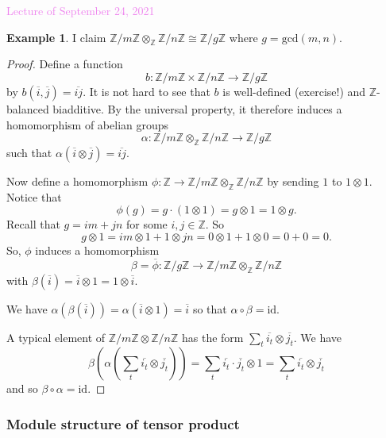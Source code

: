 \documentclass{amsart}[12pt]
\def\a{\alpha}
\newcommand{\id}{\mathrm{id}}
\newcommand{\Sept}[1]{\textcolor{violet}{Lecture of September #1, 2021}}
\newcommand{\Z}{\mathbb{Z}}
\numberwithin{equation}{section}
\theoremstyle{plain} %
\theoremstyle{definition}
\newtheorem{ex}[equation]{Example}
\theoremstyle{remark}
\newcommand{\sssec}[1]{\subsubsection{#1}}
\begin{document}
\Sept{24}

\begin{ex} I claim $\Z/m\Z \otimes_\Z \Z/n\Z \cong \Z/g\Z$ where $g = \mathrm{gcd}(m,n)$.
\end{ex}


\begin{proof}
Define a function
$$
b: \Z/m\Z \times \Z/n\Z \to \Z/g\Z
$$ 
by $b(\overline{i}, \overline{j}) = \overline{ij}$. It is not hard to see that $b$ is well-defined (exercise!) 
and $\Z$-balanced biadditive.
By the universal property, it therefore induces a homomorphism of abelian groups
$$
\a: \Z/m\Z \otimes_\Z \Z/n\Z \to \Z/g\Z
$$ 
such that $\a(\overline{i} \otimes \overline{j}) = \overline{ij}$. 

Now define a homomorphism $\phi: \Z \to \Z/m\Z \otimes_\Z \Z/n\Z$ by sending $1$ to $1 \otimes 1$. Notice that 
$$
\phi(g) = g \cdot (1 \otimes 1) = g \otimes 1 = 1 \otimes g.
$$
Recall that $g = i m + j n$ for some $i,j \in \Z$. So
$$
g \otimes 1 = i m \otimes 1 + 1 \otimes j n = 0 \otimes 1 + 1 \otimes 0 = 0 + 0 = 0.
$$
So, $\phi$ induces a homomorphism
$$
\beta = \overline{\phi}: \Z/g\Z \to \Z/m\Z \otimes_\Z \Z/n\Z
$$
with $\beta(\overline{i}) = \overline{i} \otimes 1 = 1 \otimes \overline{i}$.

We have $\a(\beta(\overline{i})) = \a(\overline{i} \otimes 1) = \overline{i}$ so that $\a \circ \beta = \id$. 

A typical element of  $\Z/m\Z \otimes \Z/n\Z$ has the form $\sum_t \overline{i_t} \otimes \overline{j_t}$. We have 
$$
\beta(\alpha(\sum_t \overline{i_t} \otimes \overline{j_t}))
= \sum_t \overline{i_t} \cdot \overline{j_t} \otimes 1
= \sum_t \overline{i_t}   \otimes  \overline{j_t}
$$
and so $\beta \circ \alpha = \id$. 
\end{proof}


\sssec{Module structure of tensor product}
\end{document}
